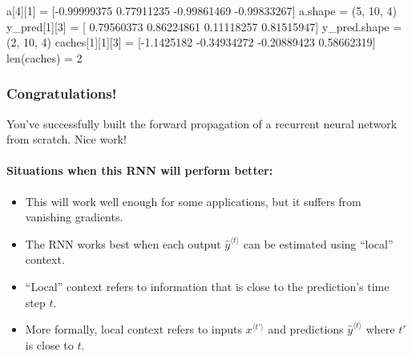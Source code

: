 \documentclass[11pt]{article}
\providecommand{\tightlist}{%
      \setlength{\itemsep}{0pt}\setlength{\parskip}{0pt}}
\newenvironment{Shaded}{}{}
\newcommand{\DecValTok}[1]{\textcolor[rgb]{0.25,0.63,0.44}{{#1}}}
\newcommand{\FloatTok}[1]{\textcolor[rgb]{0.25,0.63,0.44}{{#1}}}
\newcommand{\NormalTok}[1]{{#1}}
\newcommand{\OperatorTok}[1]{\textcolor[rgb]{0.40,0.40,0.40}{{#1}}}
\newcommand{\BuiltInTok}[1]{{#1}}
\begin{document}
\begin{Shaded}
\begin{Highlighting}[]
\NormalTok{a[}\DecValTok{4}\NormalTok{][}\DecValTok{1}\NormalTok{] }\OperatorTok{=} 
\NormalTok{ [}\OperatorTok{{-}}\FloatTok{0.99999375}  \FloatTok{0.77911235} \OperatorTok{{-}}\FloatTok{0.99861469} \OperatorTok{{-}}\FloatTok{0.99833267}\NormalTok{]}
\NormalTok{a.shape }\OperatorTok{=} 
\NormalTok{ (}\DecValTok{5}\NormalTok{, }\DecValTok{10}\NormalTok{, }\DecValTok{4}\NormalTok{)}
\NormalTok{y\_pred[}\DecValTok{1}\NormalTok{][}\DecValTok{3}\NormalTok{] }\OperatorTok{=}
\NormalTok{ [ }\FloatTok{0.79560373}  \FloatTok{0.86224861}  \FloatTok{0.11118257}  \FloatTok{0.81515947}\NormalTok{]}
\NormalTok{y\_pred.shape }\OperatorTok{=} 
\NormalTok{ (}\DecValTok{2}\NormalTok{, }\DecValTok{10}\NormalTok{, }\DecValTok{4}\NormalTok{)}
\NormalTok{caches[}\DecValTok{1}\NormalTok{][}\DecValTok{1}\NormalTok{][}\DecValTok{3}\NormalTok{] }\OperatorTok{=}
\NormalTok{ [}\OperatorTok{{-}}\FloatTok{1.1425182}  \OperatorTok{{-}}\FloatTok{0.34934272} \OperatorTok{{-}}\FloatTok{0.20889423}  \FloatTok{0.58662319}\NormalTok{]}
\BuiltInTok{len}\NormalTok{(caches) }\OperatorTok{=} 
 \DecValTok{2}
\end{Highlighting}
\end{Shaded}

    \hypertarget{congratulations}{%
\subsubsection{Congratulations!}\label{congratulations}}

You've successfully built the forward propagation of a recurrent neural
network from scratch. Nice work!

\hypertarget{situations-when-this-rnn-will-perform-better}{%
\paragraph{Situations when this RNN will perform
better:}\label{situations-when-this-rnn-will-perform-better}}

\begin{itemize}
\tightlist
\item
  This will work well enough for some applications, but it suffers from
  vanishing gradients.
\item
  The RNN works best when each output \(\hat{y}^{\langle t \rangle}\)
  can be estimated using ``local'' context.\\
\item
  ``Local'' context refers to information that is close to the
  prediction's time step \(t\).
\item
  More formally, local context refers to inputs
  \(x^{\langle t' \rangle}\) and predictions
  \(\hat{y}^{\langle t \rangle}\) where \(t'\) is close to \(t\).
\end{itemize}
\end{document}
